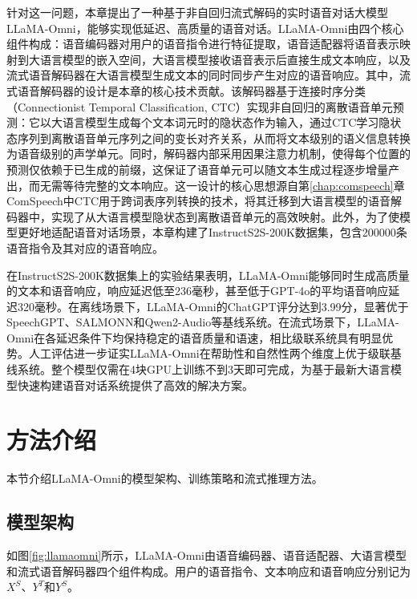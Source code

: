 针对这一问题，本章提出了一种基于非自回归流式解码的实时语音对话大模型LLaMA-Omni，能够实现低延迟、高质量的语音对话。LLaMA-Omni由四个核心组件构成：语音编码器对用户的语音指令进行特征提取，语音适配器将语音表示映射到大语言模型的嵌入空间，大语言模型接收语音表示后直接生成文本响应，以及流式语音解码器在大语言模型生成文本的同时同步产生对应的语音响应。其中，流式语音解码器的设计是本章的核心技术贡献。该解码器基于连接时序分类（Connectionist Temporal Classification, CTC）\citep{ctc}实现非自回归的离散语音单元预测：它以大语言模型生成每个文本词元时的隐状态作为输入，通过CTC学习隐状态序列到离散语音单元序列之间的变长对齐关系，从而将文本级别的语义信息转换为语音级别的声学单元。同时，解码器内部采用因果注意力机制，使得每个位置的预测仅依赖于已生成的前缀，这保证了语音单元可以随文本生成过程逐步增量产出，而无需等待完整的文本响应。这一设计的核心思想源自第\ref{chap:comspeech}章ComSpeech中CTC用于跨词表序列转换的技术，将其迁移到大语言模型的语音解码器中，实现了从大语言模型隐状态到离散语音单元的高效映射。此外，为了使模型更好地适配语音对话场景，本章构建了InstructS2S-200K数据集，包含200000条语音指令及其对应的语音响应。

在InstructS2S-200K数据集上的实验结果表明，LLaMA-Omni能够同时生成高质量的文本和语音响应，响应延迟低至236毫秒，甚至低于GPT-4o\citep{gpt4o}的平均语音响应延迟320毫秒。在离线场景下，LLaMA-Omni的ChatGPT评分达到3.99分，显著优于SpeechGPT\citep{zhang-etal-2023-speechgpt}、SALMONN\citep{tang2024salmonn}和Qwen2-Audio\citep{Qwen2-Audio}等基线系统。在流式场景下，LLaMA-Omni在各延迟条件下均保持稳定的语音质量和语速，相比级联系统具有明显优势。人工评估进一步证实LLaMA-Omni在帮助性和自然性两个维度上优于级联基线系统。整个模型仅需在4块GPU上训练不到3天即可完成，为基于最新大语言模型快速构建语音对话系统提供了高效的解决方案。


\section{方法介绍}

本节介绍LLaMA-Omni的模型架构、训练策略和流式推理方法。

\subsection{模型架构}

如图\ref{fig:llamaomni}所示，LLaMA-Omni由语音编码器、语音适配器、大语言模型和流式语音解码器四个组件构成。用户的语音指令、文本响应和语音响应分别记为$X^S$、$Y^T$和$Y^S$。



